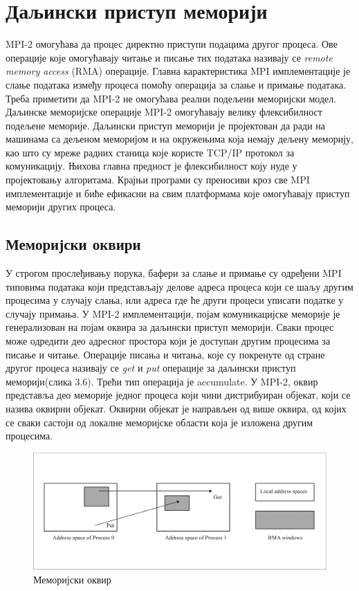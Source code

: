 \section{Даљински приступ меморији}
MPI-2 омогућава да процес директно приступи подацима другог процеса. Ове операције које омогућавају читање и писање тих података називају се \textit{remote memory access} (\gls{RMA}) операције. Главна карактеристика MPI имплементације је слање података између процеса помоћу операција за слање и примање података. 
Треба приметити да MPI-2 не омогућава реални подељени меморијски модел. Даљинске меморијске операције MPI-2 омогућавају велику флексибилност подељене меморије. 
Даљински приступ меморији је пројектован да ради на машинама са дељеном меморијом и на окружењима која немају дељену меморију, као што су мреже радних станица које користе TCP/IP протокол за комуникацију. Њихова главна предност је флексибилност коју нуде у пројектовању алгоритама. Крајњи програми су преносиви кроз све MPI имплементације и биће ефикасни на свим платформама које омогућавају приступ меморији других процеса.

\subsection{Меморијски оквири}

У строгом прослеђивању порука, бафери за слање и примање су одређени MPI типовима података који представљају делове адреса процеса који се шаљу другим процесима у случају слања, или адреса где ће други процеси уписати податке у случају примања. У MPI-2 имплементацији, појам комуникацијске меморије је генерализован на појам оквира за даљински приступ меморији. Сваки процес
може одредити део адресног простора који је доступан другим процесима за писање и читање. Операције писања и читања, које су покренуте од стране другог процеса називају се \textit{get} и \textit{put} операције за даљински приступ меморији(слика 3.6). Трећи тип операција је accumulate. У MPI-2, оквир представља део меморије једног процеса који чини дистрибуиран објекат, који се назива оквирни објекат. Оквирни објекат је направљен од више оквира, од којих се сваки састоји од локалне меморијске области која је изложена другим процесима.

\begin{figure}[h!]
  \centering
      \includegraphics[width=1\textwidth]{slike/mpi_remote.png}
  \caption{Меморијски оквир}
\end{figure}

